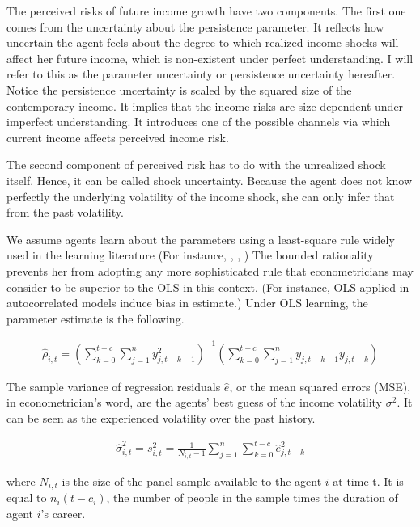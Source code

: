 \documentclass[12pt,notitlepage,onecolumn,aps,pra]{article}
\begin{document}
The perceived risks of future income growth have two components. The
first one comes from the uncertainty about the persistence parameter. It
reflects how uncertain the agent feels about the degree to which
realized income shocks will affect her future income, which is
non-existent under perfect understanding. I will refer to this as the
parameter uncertainty or persistence uncertainty hereafter. Notice the
persistence uncertainty is scaled by the squared size of the
contemporary income. It implies that the income risks are size-dependent
under imperfect understanding. It introduces one of the possible
channels via which current income affects perceived income risk.

The second component of perceived risk has to do with the unrealized
shock itself. Hence, it can be called shock uncertainty. Because the
agent does not know perfectly the underlying volatility of the income
shock, she can only infer that from the past volatility.

We assume agents learn about the parameters using a least-square rule
widely used in the learning literature (For instance,
\cite{marcet1989convergence}, \cite{evans2012learning},
\cite{malmendier2015learning}) The bounded rationality prevents her from
adopting any more sophisticated rule that econometricians may consider
to be superior to the OLS in this context. (For instance, OLS applied in
autocorrelated models induce bias in estimate.) Under OLS learning, the
parameter estimate is the following.

\begin{eqnarray}
\hat \rho_{i,t} = (\sum^{t-c}_{k=0}\sum^{n}_{j=1}y^2_{j,t-k-1})^{-1}(\sum^{t-c}_{k=0}\sum^{n}_{j=1}y_{j,t-k-1}y_{j,t-k})
\end{eqnarray}

The sample variance of regression residuals \(\widehat e\), or the mean
squared errors (MSE), in econometrician's word, are the agents' best
guess of the income volatility \(\sigma^2\). It can be seen as the
experienced volatility over the past history.

\begin{eqnarray}
\widehat{\sigma}^2_{i,t} = s^2_{i,t} = \frac{1}{N_{i,t}-1} \sum^{n}_{j=1}\sum^{t-c}_{k=0} \hat e_{j,t-k}^2
\end{eqnarray}

where \(N_{i,t}\) is the size of the panel sample available to the agent
\(i\) at time t. It is equal to \(n_{i}(t-c_{i})\), the number of people
in the sample times the duration of agent \(i\)'s career.
\end{document}
